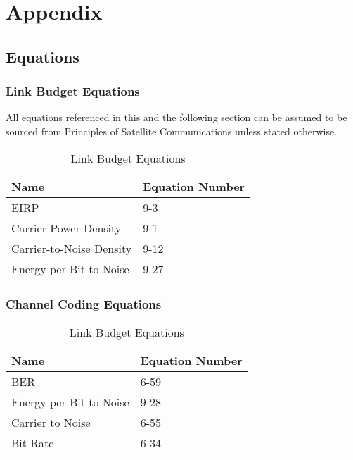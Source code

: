 \documentclass[12pt]{article}
\begin{document}
\section{Appendix}
\subsection{Equations}
\subsubsection{Link Budget Equations \label{sect:link_eqn}}

All equations referenced in this and the following section can be assumed to be sourced from Principles of Satellite Communications \cite{book} unless stated otherwise.

\begin{table}[H]
\centering
\caption{Link Budget Equations}
\label{table:link_eqn}
\begin{tabular}{ll}
 \hline
Name                           & Equation Number \\
\hline
EIRP                            & 9-3      \\
Carrier Power Density           & 9-1      \\
Carrier-to-Noise Density        & 9-12      \\
Energy per Bit-to-Noise         & 9-27      \\
\hline
\end{tabular}
\end{table}

\subsubsection{Channel Coding Equations \label{sect:code_eqn}}
\begin{table}[H]
\centering
\caption{Link Budget Equations}
\label{table:link_eqn}
\begin{tabular}{ll}
 \hline
Name                           & Equation Number \\
\hline
BER                             & 6-59      \\
Energy-per-Bit to Noise         & 9-28      \\
Carrier to Noise                & 6-55      \\
Bit Rate                        & 6-34      \\
\hline
\end{tabular}
\end{table}
\end{document}
